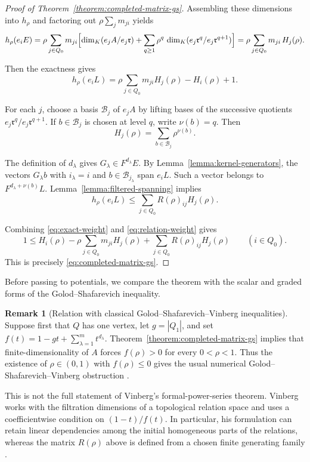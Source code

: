 \documentclass[11pt,letterpaper,reqno]{amsart}
\theoremstyle{definition}
\newtheorem{remark}[remark]{Remark}
\newcommand{\rA}{\mathfrak r}
\begin{document}
\begin{proof}[Proof of Theorem~\ref{theorem:completed-matrix-gs}]
Assembling these dimensions into $h_\rho$ and factoring out
$\rho\sum_jm_{ji}$ yields
\[
 h_\rho(e_iE)
 =\rho\sum_{j\in Q_0}m_{ji}
  \Bigl[\dim_K(e_jA/e_j\rA)
   +\sum_{q\geq1}\rho^{q}\,
    \dim_K(e_j\rA^{q}/e_j\rA^{q+1})
  \Bigr]
 =\rho\sum_{j\in Q_0}m_{ji}\,H_j(\rho).
\]

Then the exactness gives
		\begin{equation}
			\label{eq:exact-weight}
			h_\rho(e_iL)
			=\rho\sum_{j\in Q_0}m_{ji}H_j(\rho)-H_i(\rho)+1.
		\end{equation}
		
		For each $j$, choose a basis $\mathcal B_j$ of $e_jA$ by lifting bases of
		the successive quotients $e_j\rA^q/e_j\rA^{q+1}$.  If
		$b\in\mathcal B_j$ is chosen at level $q$, write $\nu(b)=q$.  Then
		\[
		H_j(\rho)=\sum_{b\in\mathcal B_j}\rho^{\nu(b)}.
		\]
		
		The definition of $d_\lambda$ gives
		$G_\lambda\in F^{d_\lambda}E$.  By
		Lemma~\ref{lemma:kernel-generators}, the vectors $G_\lambda b$ with
		$i_\lambda=i$ and $b\in\mathcal B_{j_\lambda}$ span $e_iL$.
		Such a vector belongs to $F^{d_\lambda+\nu(b)}L$.
		Lemma~\ref{lemma:filtered-spanning} implies
		\begin{equation}
			\label{eq:relation-weight}
			h_\rho(e_iL)
			\leq\sum_{j\in Q_0}R(\rho)_{ij}H_j(\rho).
		\end{equation}
		
		Combining \eqref{eq:exact-weight} and \eqref{eq:relation-weight} gives
		\[
		1\leq H_i(\rho)-\rho\sum_{j\in Q_0}m_{ji}H_j(\rho)
		+\sum_{j\in Q_0}R(\rho)_{ij}H_j(\rho)
		\qquad(i\in Q_0).
		\]
		This is precisely \eqref{eq:completed-matrix-gs}.
	\end{proof}
	
	Before passing to potentials, we compare the theorem with the scalar and graded forms of the Golod--Shafarevich inequality.
	
	\begin{remark}[Relation with classical Golod--Shafarevich--Vinberg inequalities]
		Suppose first that $Q$ has one vertex, let $g=|Q_1|$, and set $f(t)=1-gt+\sum_{\lambda=1}^m t^{d_\lambda}$. Theorem~\ref{theorem:completed-matrix-gs} implies that
		finite-dimensionality of $A$ forces $f(\rho)>0$ for every $0<\rho<1$.
		Thus the existence of $\rho\in(0,1)$ with $f(\rho)\leq0$ gives the
		usual numerical Golod--Shafarevich--Vinberg obstruction \cite{GolodShafarevich,Golod,Vinberg}.
		
		This is not the full statement of Vinberg's formal-power-series theorem.
		Vinberg works with the filtration dimensions of a topological relation space
		and uses a coefficientwise condition on $(1-t)/f(t)$.  In particular, his
		formulation can retain linear dependencies among the initial homogeneous
		parts of the relations, whereas the matrix $R(\rho)$ above is defined from a
		chosen finite generating family \cite{Vinberg}.
	\end{remark}
	
\end{document}
